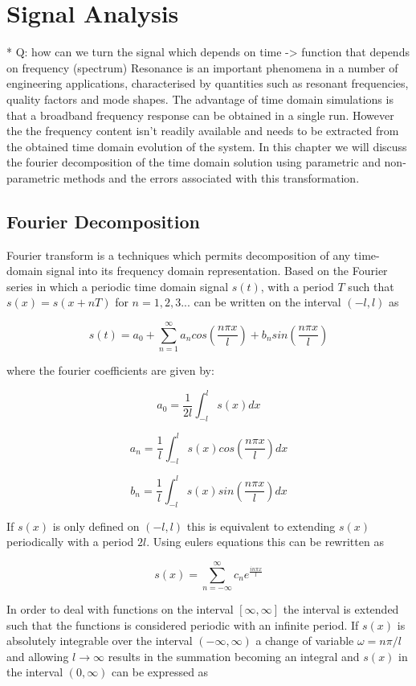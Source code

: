 \chapter{Signal Analysis}
\label{Ch:SignalAnalysis}

* Q: how can we turn the signal which depends on time -> function that depends
on frequency (spectrum)
Resonance is an important phenomena in a number of engineering applications, characterised by quantities such as resonant frequencies, quality factors and mode shapes. The advantage of time domain simulations is that a broadband frequency response can be obtained in a single run. However the the frequency content isn't readily available and needs to be extracted from the obtained time domain evolution of the system. In this chapter we will discuss the fourier decomposition of the time domain solution using parametric and non-parametric methods and the errors associated with this transformation.

\section{Fourier Decomposition}
Fourier transform is a techniques which permits decomposition of any time-domain signal into its frequency domain representation. Based on the Fourier series in which a periodic time domain signal $s(t)$, with a period $T$ such that $s(x)=s(x+nT)$ for $n=1,2,3 ...$ can be written on the interval $(-l,l)$ as

$$
s(t) = a_0 + \sum_{n=1}^{\infty} a_n cos(\frac{n\pi x}{l}) + b_n sin(\frac{n\pi x}{l})
$$

where the fourier coefficients are given by:

$$
a_0 = \frac{1}{2l}\int_{-l}^{l} s(x) dx
$$

$$
a_n = \frac{1}{l}\int_{-l}^{l} s(x) cos(\frac{n \pi x}{l}) dx
$$

$$
b_n = \frac{1}{l}\int_{-l}^{l} s(x) sin(\frac{n \pi x}{l}) dx
$$

If $s(x)$ is only defined on $(-l,l)$ this is equivalent to extending $s(x)$ periodically with a period $2l$. Using eulers equations this can be rewritten as

$$
s(x) = \sum_{n=-\infty}^{\infty} c_n e^{\frac{i n \pi x}{l}}
$$

In order to deal with functions on the interval $[\infty,\infty]$ the interval is extended such that the functions is considered periodic with an infinite period. If $s(x)$ is absolutely integrable over the interval $(-\infty,\infty)$ a change of variable $\omega = n \pi / l$ and allowing $l \to \infty$ results in the summation becoming an integral and $s(x)$ in the interval $(0,\infty)$ can be expressed as

